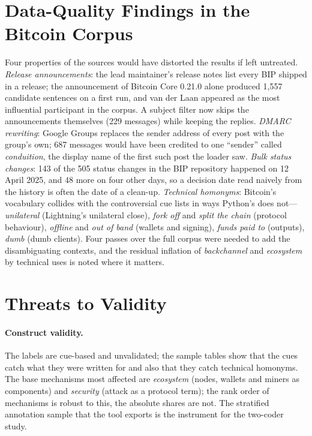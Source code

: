 \section{Data-Quality Findings in the Bitcoin Corpus}
\label{sec:dataquality}

Four properties of the sources would have distorted the results if left untreated. \emph{Release announcements}: the lead maintainer's release notes list every BIP shipped in a release; the announcement of Bitcoin Core 0.21.0 alone produced 1,557 candidate sentences on a first run, and van der Laan appeared as the most influential participant in the corpus. A subject filter now skips the announcements themselves (229 messages) while keeping the replies. \emph{DMARC rewriting}: Google Groups replaces the sender address of every post with the group's own; 687 messages would have been credited to one ``sender'' called \emph{conduition}, the display name of the first such post the loader saw. \emph{Bulk status changes}: 143 of the 505 status changes in the BIP repository happened on 12 April 2025, and 48 more on four other days, so a decision date read naively from the history is often the date of a clean-up. \emph{Technical homonyms}: Bitcoin's vocabulary collides with the controversial cue lists in ways Python's does not---\emph{unilateral} (Lightning's unilateral close), \emph{fork off} and \emph{split the chain} (protocol behaviour), \emph{offline} and \emph{out of band} (wallets and signing), \emph{funds paid to} (outputs), \emph{dumb} (dumb clients). Four passes over the full corpus were needed to add the disambiguating contexts, and the residual inflation of \emph{backchannel} and \emph{ecosystem} by technical uses is noted where it matters.

\section{Threats to Validity}
\label{sec:threats}

\paragraph{Construct validity.} The labels are cue-based and unvalidated; the sample tables show that the cues catch what they were written for and also that they catch technical homonyms. The base mechanisms most affected are \emph{ecosystem} (nodes, wallets and miners as components) and \emph{security} (attack as a protocol term); the rank order of mechanisms is robust to this, the absolute shares are not. The stratified annotation sample that the tool exports is the instrument for the two-coder study.

